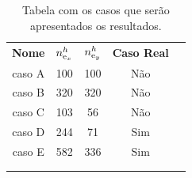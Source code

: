 \begin{table}[]
    \caption{Tabela com os casos que serão apresentados os resultados. }\label{tab:descricaoModelos}
    \centering
    \begin{tabular}{ccccl}
    \cline{1-4}
    \multicolumn{1}{|c|}{\textbf{Nome}} & \multicolumn{1}{c|}{$n_{\text{e}_x}^h$} & \multicolumn{1}{c|}{$n_{\text{e}_y}^h$ } & \multicolumn{1}{c|}{\textbf{Caso Real}} &  \\ \cline{1-4}
    \multicolumn{1}{|c|}{caso A}        & \multicolumn{1}{c|}{100}         & \multicolumn{1}{c|}{100}         & \multicolumn{1}{c|}{Não}                   &  \\ \cline{1-4}
    \multicolumn{1}{|c|}{caso B}        & \multicolumn{1}{c|}{320}         & \multicolumn{1}{c|}{320}         & \multicolumn{1}{c|}{Não}                   &  \\ \cline{1-4}
    \multicolumn{1}{|c|}{caso C}        & \multicolumn{1}{c|}{103}         & \multicolumn{1}{c|}{56}          & \multicolumn{1}{c|}{Não}                   &  \\ \cline{1-4}
    \multicolumn{1}{|c|}{caso D}        & \multicolumn{1}{c|}{244}         & \multicolumn{1}{c|}{71}          & \multicolumn{1}{c|}{Sim}                &  \\ \cline{1-4}
    \multicolumn{1}{|c|}{caso E}        & \multicolumn{1}{c|}{582}         & \multicolumn{1}{c|}{336}         & \multicolumn{1}{c|}{Sim}                &  \\ \cline{1-4}
    \multicolumn{1}{l}{}                & \multicolumn{1}{l}{}             & \multicolumn{1}{l}{}             & \multicolumn{1}{l}{}                    &  \\
    \multicolumn{1}{l}{}                & \multicolumn{1}{l}{}             & \multicolumn{1}{l}{}             & \multicolumn{1}{l}{}                    & 
    \end{tabular}
\end{table}



    

